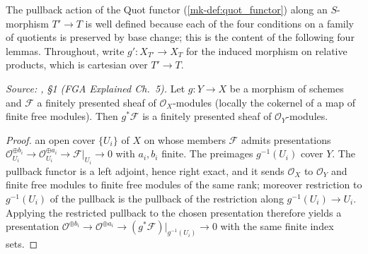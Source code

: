 The pullback action of the Quot functor (\ref{mk-def:quot_functor}) along an
\(S\)-morphism \(T' \to T\) is well defined because each of the four
conditions on a family of quotients is preserved by base change; this is the
content of the following four lemmas.  Throughout, write
\(g' : X_{T'} \to X_T\) for the induced morphism on relative products, which
is cartesian over \(T' \to T\).

\begin{lemma}\label{mk-lem:pullback_finite_presentation}
  \leanok

  \textit{Source: \cite{nitsure-hilbert-quot}, \S 1 (FGA Explained Ch.~5).}
  Let \(g : Y \to X\) be a morphism of schemes and \(\mathcal{F}\) a finitely
  presented sheaf of \(\mathcal{O}_X\)-modules (locally the cokernel of a map
  of finite free modules).  Then \(g^* \mathcal{F}\) is a finitely presented
  sheaf of \(\mathcal{O}_Y\)-modules.
\end{lemma}
\begin{proof}
  \leanokChoose an open cover \(\{U_i\}\) of \(X\) on whose members \(\mathcal{F}\)
  admits presentations
  \(\mathcal{O}_{U_i}^{\oplus b_i} \to \mathcal{O}_{U_i}^{\oplus a_i} \to
  \mathcal{F}|_{U_i} \to 0\) with \(a_i, b_i\) finite.  The preimages
  \(g^{-1}(U_i)\) cover \(Y\).  The pullback functor is a left adjoint, hence
  right exact, and it sends \(\mathcal{O}_X\) to \(\mathcal{O}_Y\) and finite
  free modules to finite free modules of the same rank; moreover restriction
  to \(g^{-1}(U_i)\) of the pullback is the pullback of the restriction along
  \(g^{-1}(U_i) \to U_i\).  Applying the restricted pullback to the chosen
  presentation therefore yields a presentation
  \(\mathcal{O}^{\oplus b_i} \to \mathcal{O}^{\oplus a_i} \to
  (g^*\mathcal{F})|_{g^{-1}(U_i)} \to 0\) with the same finite index sets.
\end{proof}

